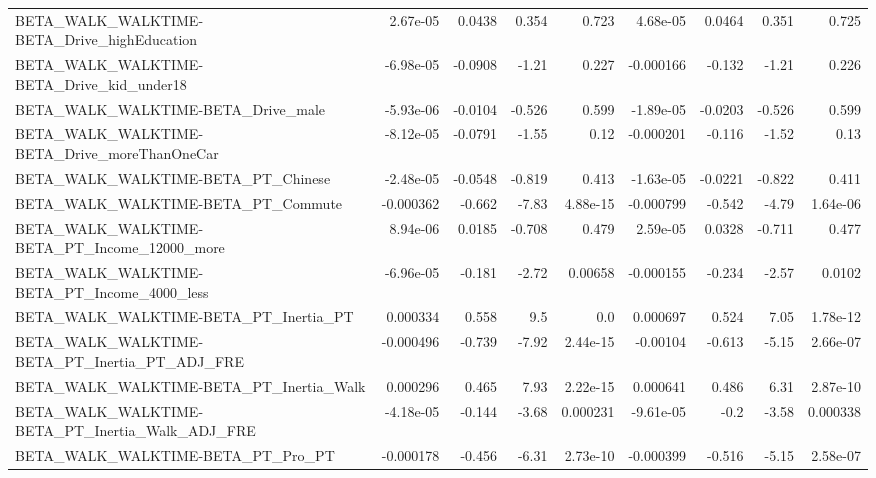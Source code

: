 \begin{tabular}{lrrrrrrrr}
BETA\_WALK\_WALKTIME-BETA\_Drive\_highEducation        &    2.67e-05 &       0.0438 &    0.354 &    0.723 &   4.68e-05 &      0.0464 &        0.351 &         0.725 \\
BETA\_WALK\_WALKTIME-BETA\_Drive\_kid\_under18          &   -6.98e-05 &      -0.0908 &    -1.21 &    0.227 &  -0.000166 &      -0.132 &        -1.21 &         0.226 \\
BETA\_WALK\_WALKTIME-BETA\_Drive\_male                 &   -5.93e-06 &      -0.0104 &   -0.526 &    0.599 &  -1.89e-05 &     -0.0203 &       -0.526 &         0.599 \\
BETA\_WALK\_WALKTIME-BETA\_Drive\_moreThanOneCar       &   -8.12e-05 &      -0.0791 &    -1.55 &     0.12 &  -0.000201 &      -0.116 &        -1.52 &          0.13 \\
BETA\_WALK\_WALKTIME-BETA\_PT\_Chinese                 &   -2.48e-05 &      -0.0548 &   -0.819 &    0.413 &  -1.63e-05 &     -0.0221 &       -0.822 &         0.411 \\
BETA\_WALK\_WALKTIME-BETA\_PT\_Commute                 &   -0.000362 &       -0.662 &    -7.83 & 4.88e-15 &  -0.000799 &      -0.542 &        -4.79 &      1.64e-06 \\
BETA\_WALK\_WALKTIME-BETA\_PT\_Income\_12000\_more       &    8.94e-06 &       0.0185 &   -0.708 &    0.479 &   2.59e-05 &      0.0328 &       -0.711 &         0.477 \\
BETA\_WALK\_WALKTIME-BETA\_PT\_Income\_4000\_less        &   -6.96e-05 &       -0.181 &    -2.72 &  0.00658 &  -0.000155 &      -0.234 &        -2.57 &        0.0102 \\
BETA\_WALK\_WALKTIME-BETA\_PT\_Inertia\_PT              &    0.000334 &        0.558 &      9.5 &      0.0 &   0.000697 &       0.524 &         7.05 &      1.78e-12 \\
BETA\_WALK\_WALKTIME-BETA\_PT\_Inertia\_PT\_ADJ\_FRE      &   -0.000496 &       -0.739 &    -7.92 & 2.44e-15 &   -0.00104 &      -0.613 &        -5.15 &      2.66e-07 \\
BETA\_WALK\_WALKTIME-BETA\_PT\_Inertia\_Walk            &    0.000296 &        0.465 &     7.93 & 2.22e-15 &   0.000641 &       0.486 &         6.31 &      2.87e-10 \\
BETA\_WALK\_WALKTIME-BETA\_PT\_Inertia\_Walk\_ADJ\_FRE    &   -4.18e-05 &       -0.144 &    -3.68 & 0.000231 &  -9.61e-05 &        -0.2 &        -3.58 &      0.000338 \\
BETA\_WALK\_WALKTIME-BETA\_PT\_Pro\_PT                  &   -0.000178 &       -0.456 &    -6.31 & 2.73e-10 &  -0.000399 &      -0.516 &        -5.15 &      2.58e-07 \\

\end{tabular}
